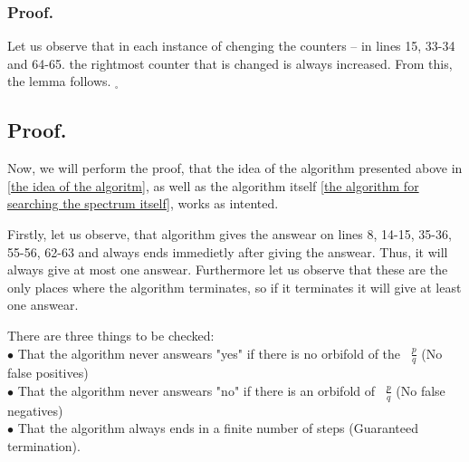 \subsubsection{Proof.}
Let us observe that in each instance of chenging the counters -- in lines 15, 33-34 and 64-65. 
the rightmost counter that is changed is always increased. From this, the lemma follows. 
$_\square$
\subsection{Proof.}\label{proof of the correctness of the algorithm}
Now, we will perform the proof, that the idea of the algorithm presented above in 
\ref{the idea of the algoritm}, as 
well as the algorithm itself \ref{the algorithm for searching the spectrum itself}, 
works as intented.

Firstly, let us observe, that algorithm gives the answear on lines 8, 14-15, 35-36, 55-56, 
62-63 and 
always ends immedietly after giving the answear. Thus, it will always give at most one answear.
Furthermore let us observe that these are the only places where the algorithm terminates, 
so if it terminates it will give at least one answear.
 
There are three things to be checked: \\
$\bullet$ That the algorithm never answears "yes" if there is no orbifold of the \Eoc\ 
$\frac{p}{q}$ (No false positives)\\
$\bullet$ That the algorithm never answears "no" if there is an orbifold of \Eoc\ 
$\frac{p}{q}$ (No false negatives)\\ 
$\bullet$ That the algorithm always ends in a finite number of steps (Guaranteed termination). 








